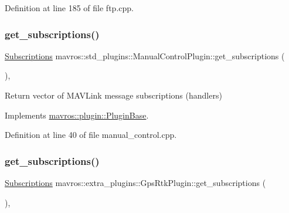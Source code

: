 Definition at line 185 of file ftp.\+cpp.

\mbox{\label{group__plugin_ga2cd6218d2064c57672b01df2900c3de2}} 
\subsubsection{\texorpdfstring{get\_subscriptions()}{get\_subscriptions()}\hspace{0.1cm}{\footnotesize\ttfamily [1/41]}}
{\footnotesize\ttfamily \mbox{\hyperlink{group__plugin_ga8967d61fc77040e0c3ea5a4585d62a09}{Subscriptions}} mavros\+::std\+\_\+plugins\+::\+Manual\+Control\+Plugin\+::get\+\_\+subscriptions (\begin{DoxyParamCaption}{ }\end{DoxyParamCaption})\hspace{0.3cm}{\ttfamily [inline]}, {\ttfamily [virtual]}}



Return vector of M\+A\+V\+Link message subscriptions (handlers) 



Implements \mbox{\hyperlink{group__plugin_gaf4e23fec6d7436a62cbf0942a2e5791c}{mavros\+::plugin\+::\+Plugin\+Base}}.



Definition at line 40 of file manual\+\_\+control.\+cpp.

\mbox{\label{group__plugin_ga21af691b0770c7e0b87e5fd733b0145a}} 
\subsubsection{\texorpdfstring{get\_subscriptions()}{get\_subscriptions()}\hspace{0.1cm}{\footnotesize\ttfamily [2/41]}}
{\footnotesize\ttfamily \mbox{\hyperlink{group__plugin_ga8967d61fc77040e0c3ea5a4585d62a09}{Subscriptions}} mavros\+::extra\+\_\+plugins\+::\+Gps\+Rtk\+Plugin\+::get\+\_\+subscriptions (\begin{DoxyParamCaption}{ }\end{DoxyParamCaption})\hspace{0.3cm}{\ttfamily [inline]}, {\ttfamily [virtual]}}



